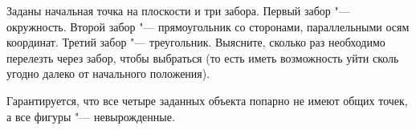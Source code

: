 Заданы начальная точка на плоскости и три забора.
Первый забор "--- окружность.
Второй забор "--- прямоугольник со сторонами, параллельными осям координат.
Третий забор "--- треугольник.
Выясните, сколько раз необходимо перелезть через забор, чтобы выбраться
(то есть иметь возможность уйти сколь угодно далеко от начального положения).

Гарантируется, что все четыре заданных объекта попарно не имеют общих точек,
а все фигуры "--- невырожденные.
